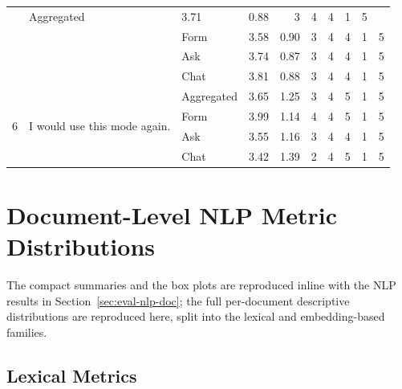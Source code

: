\begin{table}
\begin{tabularx}{\linewidth}{@{}c X l r r r r r r r@{}}
                   & Aggregated  & 3.71 & 0.88 & 3 & 4 & 4 & 1 & 5 \\
                   & & Form & 3.58 & 0.90 & 3 & 4 & 4 & 1 & 5 \\
                   & & Ask  & 3.74 & 0.87 & 3 & 4 & 4 & 1 & 5 \\
                   & & Chat & 3.81 & 0.88 & 3 & 4 & 4 & 1 & 5 \\
\midrule
\multirow{4}{*}{6} & \multirow{4}{*}{I would use this mode again.}
                   & Aggregated  & 3.65 & 1.25 & 3 & 4 & 5 & 1 & 5 \\
                   & & Form & 3.99 & 1.14 & 4 & 4 & 5 & 1 & 5 \\
                   & & Ask  & 3.55 & 1.16 & 3 & 4 & 4 & 1 & 5 \\
                   & & Chat & 3.42 & 1.39 & 2 & 4 & 5 & 1 & 5 \\
\bottomrule
\end{tabularx}
\end{table}


\section{Document-Level NLP Metric Distributions}
\label{app:items-nlp-doc}

The compact summaries and the box plots are reproduced inline with
the NLP results in Section~\ref{sec:eval-nlp-doc}; the full
per-document descriptive distributions are reproduced here, split
into the lexical and embedding-based families.

\subsection{Lexical Metrics}
\label{app:items-nlp-doc-lexical}

